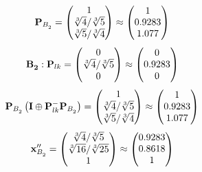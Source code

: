 \documentclass[10pt,a4paper]{article}
\begin{document}
	\[
		\bold{P}_{B_2^{}} = 
		\begin{pmatrix}
			{1}{} \\
			{\sqrt[3]{4}} / {\sqrt[3]{5}} \\
			{\sqrt[3]{5}} / {\sqrt[3]{4}} \\
		\end{pmatrix}
		\approx
		\begin{pmatrix}
			1        \\
			0.9283   \\
			1.077    \\
		\end{pmatrix}
	\]
	\[
		\bold{B_2^{}}: \bold{P}_{lk} = 
		\begin{pmatrix}
			{{0}}{} \\
			{\sqrt[3]{4}} / {\sqrt[3]{5}} \\
			{{0}}{} \\
		\end{pmatrix}
		\approx
		\begin{pmatrix}
			0        \\
			0.9283   \\
			0        \\
		\end{pmatrix}
	\]
	\[
		\bold{P}_{B_2^{}}\left(\bold{I} \oplus \bold{P}_{lk}^{-}\bold{P}_{B_2^{}}\right) = 
		\begin{pmatrix}
			{1}{} \\
			{\sqrt[3]{4}} / {\sqrt[3]{5}} \\
			{\sqrt[3]{5}} / {\sqrt[3]{4}} \\
		\end{pmatrix}
		\approx
		\begin{pmatrix}
			1        \\
			0.9283   \\
			1.077    \\
		\end{pmatrix}
	\]
	\[
		\bold{x}''_{B_2^{}} = 
		\begin{pmatrix}
			{\sqrt[3]{4}} / {\sqrt[3]{5}} \\
			{\sqrt[3]{16}} / {\sqrt[3]{25}} \\
			{1}{} \\
		\end{pmatrix}
		\approx
		\begin{pmatrix}
			0.9283   \\
			0.8618   \\
			1        \\
		\end{pmatrix}
	\]

\end{document}
